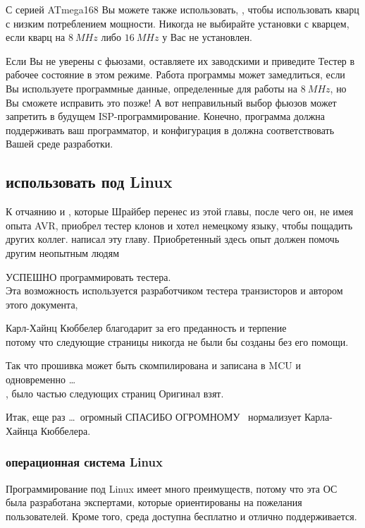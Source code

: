С серией ATmega168 Вы можете также использовать,  , 
чтобы использовать кварц с низким потреблением мощности.
Никогда не выбирайте установки с кварцем, если кварц на \(8~MHz\) либо \(16~MHz\) у Вас не установлен.

Если Вы не уверены с фьюзами, оставляете их заводскими и приведите Тестер в рабочее 
состояние в этом режиме.
Работа программы может замедлиться, если Вы используете программные данные,
определенные для работы на \(8~MHz\), но Вы сможете исправить это позже!
А вот неправильный выбор фьюзов может запретить в будущем ISP-программирование.
Конечно, программа  должна поддерживать ваш программатор, и конфигурация в  
должна соответствовать Вашей среде разработки.\\

\subsection{использовать под Linux}
\label{sec:linux}
К отчаянию и , которые Шрайбер перенес из этой главы, после чего он, не имея опыта AVR, приобрел тестер клонов и хотел  немецкому языку, чтобы пощадить других коллег. написал эту главу.
Приобретенный здесь опыт должен помочь другим  неопытным людям
 
УСПЕШНО программировать тестера. \\
Эта возможность используется разработчиком тестера транзисторов и автором этого документа,

Карл-Хайнц Кюббелер благодарит \cite {karlheinz1} за его преданность и терпение \\
потому что следующие страницы никогда не были бы созданы без его помощи.
     
Так что прошивка может быть скомпилирована и записана в MCU и одновременно \dots \\
, было частью следующих страниц
Оригинал взят.

Итак, еще раз \dots \ огромный {СПАСИБО ОГРОМНОМУ}
\ нормализует Карла-Хайнца Кюббелера.
\subsubsection{операционная система Linux}
Программирование под Linux имеет много преимуществ, потому что эта ОС была разработана экспертами, которые ориентированы на пожелания пользователей.
Кроме того, среда доступна бесплатно и отлично поддерживается.

